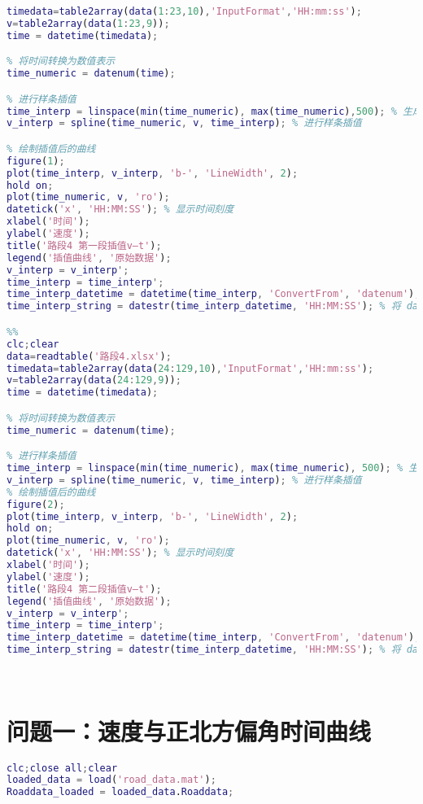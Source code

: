 \documentclass[withoutpreface,bwprint]{cumcmthesis} %
\begin{document}
\begin{appendices}
\begin{lstlisting}[language=matlab]
timedata=table2array(data(1:23,10),'InputFormat','HH:mm:ss');
v=table2array(data(1:23,9));
time = datetime(timedata);

% 将时间转换为数值表示
time_numeric = datenum(time);

% 进行样条插值
time_interp = linspace(min(time_numeric), max(time_numeric),500); % 生成插值的时间点
v_interp = spline(time_numeric, v, time_interp); % 进行样条插值

% 绘制插值后的曲线
figure(1);
plot(time_interp, v_interp, 'b-', 'LineWidth', 2);
hold on;
plot(time_numeric, v, 'ro');
datetick('x', 'HH:MM:SS'); % 显示时间刻度
xlabel('时间');
ylabel('速度');
title('路段4 第一段插值v—t');
legend('插值曲线', '原始数据');
v_interp = v_interp';
time_interp = time_interp';
time_interp_datetime = datetime(time_interp, 'ConvertFrom', 'datenum'); % 将数值型时间点转换为 datetime 格式
time_interp_string = datestr(time_interp_datetime, 'HH:MM:SS'); % 将 datetime 转换为字符串格式 HH:mm:ss

%%
clc;clear
data=readtable('路段4.xlsx');
timedata=table2array(data(24:129,10),'InputFormat','HH:mm:ss');
v=table2array(data(24:129,9));
time = datetime(timedata);

% 将时间转换为数值表示
time_numeric = datenum(time);

% 进行样条插值
time_interp = linspace(min(time_numeric), max(time_numeric), 500); % 生成插值的时间点
v_interp = spline(time_numeric, v, time_interp); % 进行样条插值
% 绘制插值后的曲线
figure(2);
plot(time_interp, v_interp, 'b-', 'LineWidth', 2);
hold on;
plot(time_numeric, v, 'ro');
datetick('x', 'HH:MM:SS'); % 显示时间刻度
xlabel('时间');
ylabel('速度');
title('路段4 第二段插值v—t');
legend('插值曲线', '原始数据');
v_interp = v_interp';
time_interp = time_interp';
time_interp_datetime = datetime(time_interp, 'ConvertFrom', 'datenum'); % 将数值型时间点转换为 datetime 格式
time_interp_string = datestr(time_interp_datetime, 'HH:MM:SS'); % 将 datetime 转换为字符串格式 HH:mm:ss




 \end{lstlisting}
 
 \section{问题一：速度与正北方偏角时间曲线}
\begin{lstlisting}[language=matlab]
clc;close all;clear
loaded_data = load('road_data.mat');
Roaddata_loaded = loaded_data.Roaddata;


\end{lstlisting}
\end{appendices}
\end{document}
